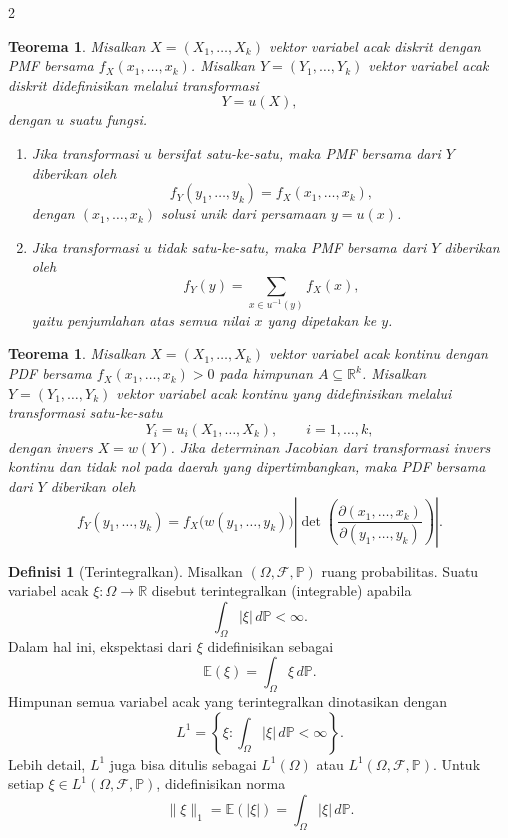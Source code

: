 \documentclass[a4paper,extrafontsizes, 9pt]{memoir}
\theoremstyle{definition}
\newtheorem{definisi}[kalstok]{Definisi}
\theoremstyle{plain}
\newtheorem{teorema}[kalstok]{Teorema}
\theoremstyle{remark}
\begin{document}
\begin{multicols}{2}
  \begin{teorema}
    Misalkan $X=(X_1,\ldots,X_k)$ vektor variabel acak diskrit dengan PMF bersama
    $f_X(x_1,\ldots,x_k)$. Misalkan $Y=(Y_1,\ldots,Y_k)$ vektor variabel acak diskrit
    didefinisikan melalui transformasi
    \[Y=u(X),\]
    dengan $u$ suatu fungsi.
    \begin{enumerate}[leftmargin=*, itemsep=0.5mm]
      \item Jika transformasi $u$ bersifat satu-ke-satu, maka PMF bersama dari $Y$ diberikan oleh
            \[f_Y(y_1,\ldots,y_k)=f_X(x_1,\ldots,x_k),\]
            dengan $(x_1,\ldots,x_k)$ solusi unik dari persamaan $y=u(x)$.
      \item Jika transformasi $u$ tidak satu-ke-satu, maka PMF bersama dari $Y$ diberikan oleh
            \[f_Y(y)=\sum_{x\in u^{-1}(y)}f_X(x),\]
            yaitu penjumlahan atas semua nilai $x$ yang dipetakan ke $y$.
    \end{enumerate}
  \end{teorema}

  \begin{teorema}
    Misalkan $X=(X_1,\ldots,X_k)$ vektor variabel acak kontinu dengan PDF bersama
    $f_X(x_1,\ldots,x_k)>0$ pada himpunan $A\subseteq\mathbb{R}^k$.
    Misalkan $Y=(Y_1,\ldots,Y_k)$ vektor variabel acak kontinu yang didefinisikan melalui
    transformasi satu-ke-satu
    \[Y_i=u_i(X_1,\ldots,X_k),\qquad i=1,\ldots,k,\]
    dengan invers $X=w(Y)$. Jika determinan Jacobian dari transformasi invers kontinu dan tidak nol
    pada daerah yang dipertimbangkan, maka PDF bersama dari $Y$ diberikan oleh
    \[f_Y(y_1,\ldots,y_k)=f_X\bigl(w(y_1,\ldots,y_k)\bigr)
      \left|\det\!\left(\frac{\partial(x_1,\ldots,x_k)}{\partial(y_1,\ldots,y_k)}\right)\right|.\]
  \end{teorema}

  \begin{definisi}[Terintegralkan]
    Misalkan $(\Omega,\mathcal{F},\mathbb{P})$ ruang probabilitas.
    Suatu variabel acak $\xi:\Omega\to\mathbb{R}$ disebut terintegralkan (integrable) apabila
    \[\int_{\Omega}|\xi|\,d\mathbb{P}<\infty.\]
    Dalam hal ini, ekspektasi dari $\xi$ didefinisikan sebagai
    \[\mathbb{E}(\xi)=\int_{\Omega}\xi\,d\mathbb{P}.\]
    Himpunan semua variabel acak yang terintegralkan dinotasikan dengan
    \[L^1=\left\{\xi:\int_{\Omega}|\xi|\,d\mathbb{P}<\infty\right\}.\]
    Lebih detail, $L^1$ juga bisa ditulis sebagai $L^1(\Omega)$ atau $L^1(\Omega,\mathcal{F},\mathbb{P})$.
    Untuk setiap $\xi\in L^1(\Omega,\mathcal{F},\mathbb{P})$, didefinisikan norma
    \[\|\xi\|_1=\mathbb{E}(|\xi|)=\int_{\Omega}|\xi|\,d\mathbb{P}.\]
  \end{definisi}


\end{multicols}
\end{document}

